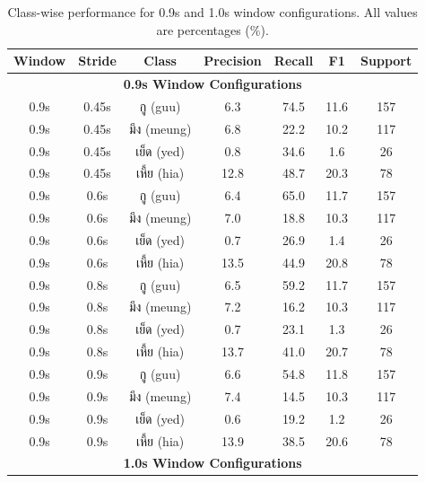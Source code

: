 \documentclass[11pt]{article}
\newcommand{\textthai}[1]{{\thaifont #1}}
\begin{document}
\begin{table}[H]
    \caption{Class-wise performance for 0.9s and 1.0s window configurations. All values are percentages (\%).}
    \centering
    \label{tab:class-performance-0.9-1.0}
    \scriptsize
    \setlength{\tabcolsep}{3pt}
    \begin{tabular}{|c|c|c|c|c|c|c|}
        \hline
        \textbf{Window} & \textbf{Stride} & \textbf{Class} & \textbf{Precision} & \textbf{Recall} & \textbf{F1} & \textbf{Support} \\
        \hline
        \multicolumn{7}{|c|}{\textbf{0.9s Window Configurations}} \\
        \hline
        0.9s & 0.45s & \textthai{กู} (guu) & 6.3 & 74.5 & 11.6 & 157 \\
        0.9s & 0.45s & \textthai{มึง} (meung) & 6.8 & 22.2 & 10.2 & 117 \\
        0.9s & 0.45s & \textthai{เย็ด} (yed) & 0.8 & 34.6 & 1.6 & 26 \\
        0.9s & 0.45s & \textthai{เหี้ย} (hia) & 12.8 & 48.7 & 20.3 & 78 \\
        \hline
        0.9s & 0.6s & \textthai{กู} (guu) & 6.4 & 65.0 & 11.7 & 157 \\
        0.9s & 0.6s & \textthai{มึง} (meung) & 7.0 & 18.8 & 10.3 & 117 \\
        0.9s & 0.6s & \textthai{เย็ด} (yed) & 0.7 & 26.9 & 1.4 & 26 \\
        0.9s & 0.6s & \textthai{เหี้ย} (hia) & 13.5 & 44.9 & 20.8 & 78 \\
        \hline
        0.9s & 0.8s & \textthai{กู} (guu) & 6.5 & 59.2 & 11.7 & 157 \\
        0.9s & 0.8s & \textthai{มึง} (meung) & 7.2 & 16.2 & 10.3 & 117 \\
        0.9s & 0.8s & \textthai{เย็ด} (yed) & 0.7 & 23.1 & 1.3 & 26 \\
        0.9s & 0.8s & \textthai{เหี้ย} (hia) & 13.7 & 41.0 & 20.7 & 78 \\
        \hline
        0.9s & 0.9s & \textthai{กู} (guu) & 6.6 & 54.8 & 11.8 & 157 \\
        0.9s & 0.9s & \textthai{มึง} (meung) & 7.4 & 14.5 & 10.3 & 117 \\
        0.9s & 0.9s & \textthai{เย็ด} (yed) & 0.6 & 19.2 & 1.2 & 26 \\
        0.9s & 0.9s & \textthai{เหี้ย} (hia) & 13.9 & 38.5 & 20.6 & 78 \\
        \hline
        \multicolumn{7}{|c|}{\textbf{1.0s Window Configurations}} \\

\end{tabular}
\end{table}
\end{document}
